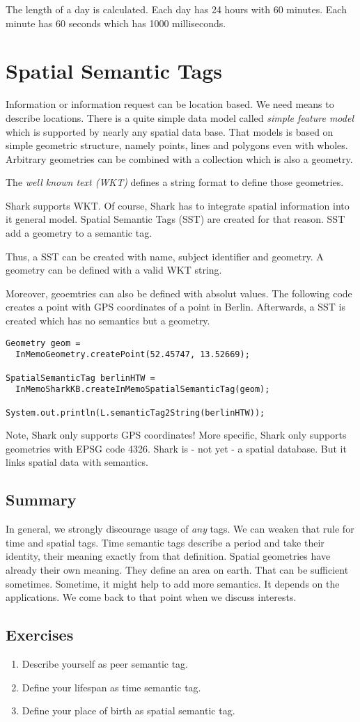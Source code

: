 The length of a day is calculated. Each day has 24 hours with 60 minutes. Each minute has 60 seconds which has 1000 milliseconds.

\section{Spatial Semantic Tags}
Information or information request can be location based. We need means to
describe locations. There is a quite simple data model called {\it simple feature model} which is supported by nearly any spatial data base. That
models is based on simple geometric structure, namely points, lines and polygons even with wholes. Arbitrary geometries can be combined with a collection which is also a geometry.

The {\it well known text (WKT)} defines a string format to define those geometries.

Shark supports WKT. Of course, Shark has to integrate spatial information into it general model. Spatial Semantic Tags (SST) are created for that reason.
SST add a geometry to a semantic tag.

Thus, a SST can be created with name, subject identifier and geometry.
A geometry can be defined with a valid WKT string.

Moreover, geoemtries can also be defined with absolut values.
The following code creates a point with GPS coordinates of a point in Berlin.
Afterwards, a SST is created which has no semantics but a geometry.

\begin{verbatim}
Geometry geom =
  InMemoGeometry.createPoint(52.45747, 13.52669);

SpatialSemanticTag berlinHTW =
  InMemoSharkKB.createInMemoSpatialSemanticTag(geom);

System.out.println(L.semanticTag2String(berlinHTW));
\end{verbatim}

Note, Shark only supports GPS coordinates! More specific, Shark only supports geometries with EPSG code 4326. Shark is - not yet - a spatial database. But it links spatial data with semantics.

\subsection{Summary}
In general, we strongly discourage usage of {\it any} tags. We can weaken that rule for time and spatial tags. Time semantic tags describe a period and
take their identity, their meaning exactly from that definition.
Spatial geometries have already their own meaning. They define an area on earth. That can be sufficient sometimes. Sometime, it might help to add more semantics. It depends on the applications. We come back to that point when we discuss interests.

\subsection{Exercises}
\begin{enumerate}
\item
Describe yourself as peer semantic tag.
\item
Define your lifespan as time semantic tag.
\item
Define your place of birth as spatial semantic tag.
\end{enumerate}
